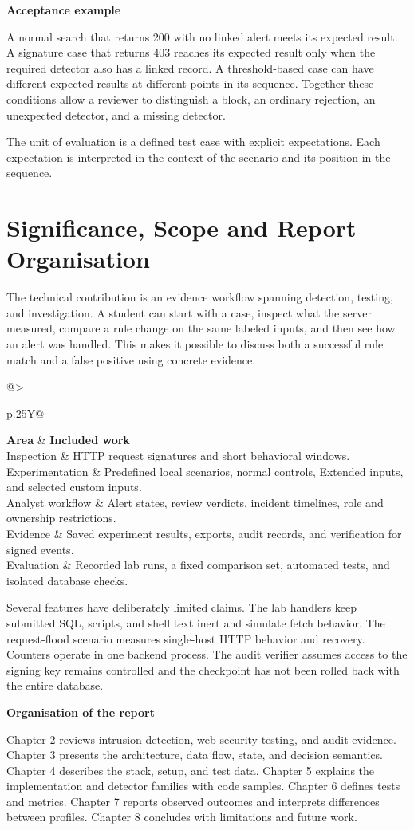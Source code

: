 \documentclass[11pt,letterpaper,oneside]{report}
\makeatletter
\newcommand{\topic}[1]{\smallskip\noindent\textbf{#1}\par\nobreak\vspace{-.39em}}
\newcommand{\sheet}[1]{\clearpage\section{#1}}
\newcommand{\tabletitle}[1]{\captionof{table}{#1}\smallskip}
\newcommand{\bodytable}[1]{\begin{tabularx}{\linewidth}{@{}>{\raggedright\arraybackslash}p{.25\linewidth}Y@{}}\toprule #1\bottomrule\end{tabularx}}
\newcommand{\callout}[1]{\noindent\colorbox{papergray}{\parbox{\dimexpr\linewidth-2\fboxsep\relax}{\small\strut #1\strut}}}
\makeatother
\begin{document}
\topic{Acceptance example}
A normal search that returns 200 with no linked alert meets its expected result. A signature case that returns 403 reaches its expected result only when the required detector also has a linked record. A threshold-based case can have different expected results at different points in its sequence. Together these conditions allow a reviewer to distinguish a block, an ordinary rejection, an unexpected detector, and a missing detector.

\callout{The unit of evaluation is a defined test case with explicit expectations. Each expectation is interpreted in the context of the scenario and its position in the sequence.}

\sheet{Significance, Scope and Report Organisation}
The technical contribution is an evidence workflow spanning detection, testing, and investigation. A student can start with a case, inspect what the server measured, compare a rule change on the same labeled inputs, and then see how an alert was handled. This makes it possible to discuss both a successful rule match and a false positive using concrete evidence.

\tabletitle{Scope of the project}
\bodytable{\textbf{Area} & \textbf{Included work}\\\midrule
Inspection & HTTP request signatures and short behavioral windows.\\
Experimentation & Predefined local scenarios, normal controls, Extended inputs, and selected custom inputs.\\
Analyst workflow & Alert states, review verdicts, incident timelines, role and ownership restrictions.\\
Evidence & Saved experiment results, exports, audit records, and verification for signed events.\\
Evaluation & Recorded lab runs, a fixed comparison set, automated tests, and isolated database checks.\\}
\par

Several features have deliberately limited claims. The lab handlers keep submitted SQL, scripts, and shell text inert and simulate fetch behavior. The request-flood scenario measures single-host HTTP behavior and recovery. Counters operate in one backend process. The audit verifier assumes access to the signing key remains controlled and the checkpoint has not been rolled back with the entire database.

\topic{Organisation of the report}
Chapter 2 reviews intrusion detection, web security testing, and audit evidence. Chapter 3 presents the architecture, data flow, state, and decision semantics. Chapter 4 describes the stack, setup, and test data. Chapter 5 explains the implementation and detector families with code samples. Chapter 6 defines tests and metrics. Chapter 7 reports observed outcomes and interprets differences between profiles. Chapter 8 concludes with limitations and future work.
\end{document}
